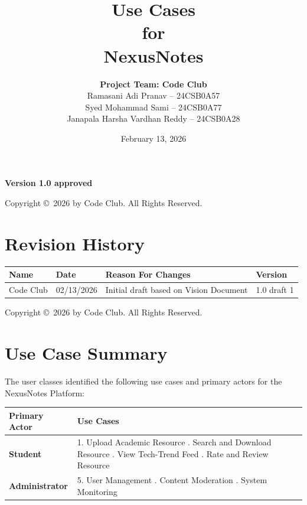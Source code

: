\documentclass[12pt,a4paper]{article}
\title{\textbf{Use Cases} \\ for \\ \textbf{NexusNotes}}
\author{
    \textbf{Project Team: Code Club}\\[0.5cm]
    Ramasani Adi Pranav -- 24CSB0A57\\
    Syed Mohammad Sami -- 24CSB0A77\\
    Janapala Harsha Vardhan Reddy -- 24CSB0A28\\[2cm]
}
\date{February 13, 2026}
\begin{document}
\maketitle
\thispagestyle{empty}
\begin{center}
    \vspace{1cm}
    \textbf{Version 1.0 approved}
    
    \vspace{4cm}
    Copyright \copyright\ 2026 by Code Club. All Rights Reserved.
\end{center}
\newpage

\section*{Revision History}
\begin{longtable}{|L{4cm}|L{3cm}|L{5cm}|L{3cm}|}
\hline
\textbf{Name} & \textbf{Date} & \textbf{Reason For Changes} & \textbf{Version} \\
\hline
Code Club & 02/13/2026 & Initial draft based on Vision Document & 1.0 draft 1 \\
\hline

\end{longtable}
\vspace{1cm}
\noindent Copyright \copyright\ 2026 by Code Club. All Rights Reserved.
\newpage

\section{Use Case Summary}
 The user classes identified the following use cases and primary actors for the NexusNotes Platform:

\begin{longtable}{|L{4cm}|L{11cm}|}
\hline
\textbf{Primary Actor} & \textbf{Use Cases} \\
\hline
\textbf{Student} & 
1.  Upload Academic Resource  .  Search and Download Resource .  View Tech-Trend Feed .  Rate and Review Resource  \\
\hline
\textbf{Administrator} & 
5.  User Management .  Content Moderation  .  System Monitoring \\
\hline
\end{longtable}
\newpage
\end{document}

